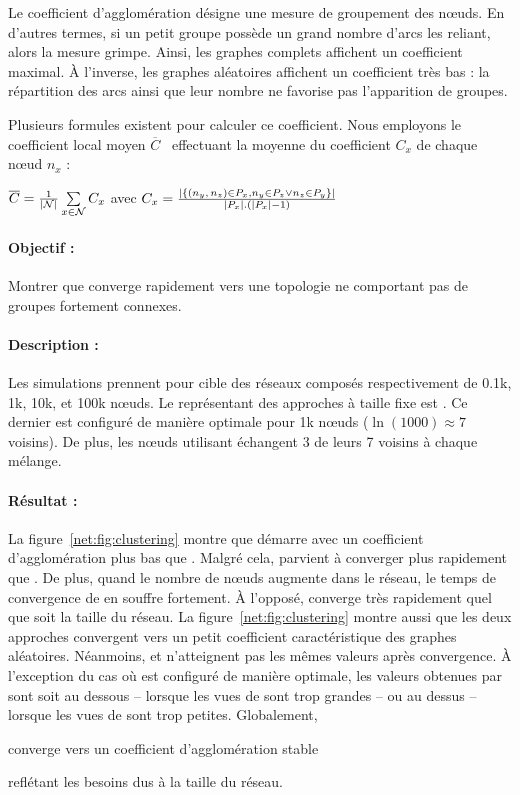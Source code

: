Le coefficient d'agglomération désigne une mesure de groupement des nœuds. En
d'autres termes, si un petit groupe possède un grand nombre d'arcs les reliant,
alors la mesure grimpe. Ainsi, les graphes complets affichent un coefficient
maximal. À l'inverse, les graphes aléatoires affichent un coefficient très bas :
la répartition des arcs ainsi que leur nombre ne favorise pas l'apparition de
groupes.

Plusieurs formules existent pour calculer ce coefficient. Nous employons le
coefficient local moyen $\overline{C}$~\cite{watts1998collective} effectuant la
moyenne du coefficient $C_x$ de chaque nœud $n_x$ :
\begin{center}
  $\overline{C} = {1\over |\mathcal{N}|}\sum\limits_{x\in\mathcal{N}}C_x$ \hfill
  avec
  $C_x = {|\{ (n_y,\,n_z) \in P_x, n_y \in P_z \vee n_z \in P_y \}|\over
    |P_x|.(|P_x|-1)}$
\end{center}

\paragraph{Objectif :} Montrer que \SPRAY converge rapidement vers une topologie
ne comportant pas de groupes fortement connexes.

\paragraph{Description :} Les simulations prennent pour cible des réseaux
composés respectivement de 0.1k, 1k, 10k, et 100k nœuds. Le représentant des
approches à taille fixe est \CYCLON. Ce dernier est configuré de manière
optimale pour 1k nœuds ($\ln(1000)\approx 7$ voisins). De plus, les nœuds
utilisant \CYCLON échangent 3 de leurs 7 voisins à chaque mélange.

\paragraph{Résultat :} La figure~\ref{net:fig:clustering} montre que \CYCLON
démarre avec un coefficient d'agglomération plus bas que \SPRAY. Malgré cela,
\SPRAY parvient à converger plus rapidement que \CYCLON. De plus, quand le
nombre de nœuds augmente dans le réseau, le temps de convergence de \CYCLON en
souffre fortement. À l'opposé, \SPRAY converge très rapidement quel que soit la
taille du réseau. La figure~\ref{net:fig:clustering} montre aussi que les deux
approches convergent vers un petit coefficient caractéristique des graphes
aléatoires. Néanmoins, \CYCLON et \SPRAY n'atteignent pas les mêmes valeurs
après convergence. À l'exception du cas où \CYCLON est configuré de manière
optimale, les valeurs obtenues par \SPRAY sont soit au dessous -- lorsque les
vues de \CYCLON sont trop grandes -- ou au dessus -- lorsque les vues de \CYCLON
sont trop petites. Globalement, \SPRAY
\begin{inparaenum}[(i)]
\item converge vers un coefficient d'agglomération stable
\item reflétant les besoins dus à la taille du réseau.
\end{inparaenum}
